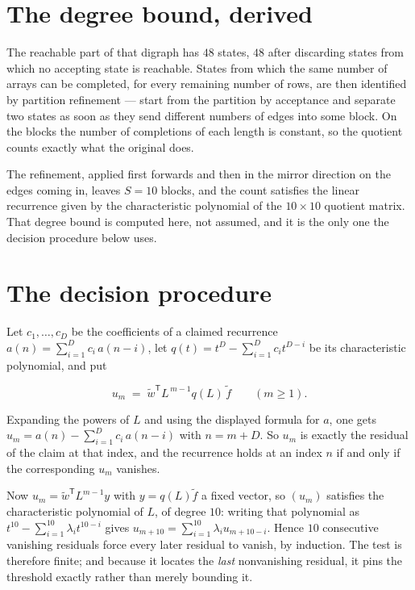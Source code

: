 \documentclass[11pt]{article}
\theoremstyle{definition}
\begin{document}
\section{The degree bound, derived}

The reachable part of that digraph has $48$ states, $48$ after discarding states from which no accepting state is reachable. States from which the same number of arrays can be completed, for every remaining number of rows, are then identified by partition refinement --- start from the partition by acceptance and separate two states as soon as they send different numbers of edges into some block. On the blocks the number of completions of each length is constant, so the quotient counts exactly what the original does.

The refinement, applied first forwards and then in the mirror direction on the edges coming in, leaves $S = 10$ blocks, and the count satisfies the linear recurrence given by the characteristic polynomial of the $10 \times 10$ quotient matrix. That degree bound is computed here, not assumed, and it is the only one the decision procedure below uses.

\section{The decision procedure}

Let $c_1,\dots,c_D$ be the coefficients of a claimed recurrence $a(n) = \sum_{i=1}^{D} c_i\,a(n-i)$, let $q(t) = t^{D} - \sum_{i=1}^{D} c_i t^{D-i}$ be its characteristic polynomial, and put

\[u_m \;=\; \tilde w^{\mathsf T} L^{\,m-1} q(L)\,\tilde f \qquad (m \ge 1).\]

Expanding the powers of $L$ and using the displayed formula for $a$, one gets $u_m = a(n) - \sum_{i=1}^{D} c_i\,a(n-i)$ with $n = m + D$. So $u_m$ is exactly the residual of the claim at that index, and the recurrence holds at an index $n$ if and only if the corresponding $u_m$ vanishes.

Now $u_m = \tilde w^{\mathsf T} L^{m-1} y$ with $y = q(L)\tilde f$ a fixed vector, so $(u_m)$ satisfies the characteristic polynomial of $L$, of degree $10$: writing that polynomial as $t^{10} - \sum_{i=1}^{10} \lambda_i t^{10-i}$ gives $u_{m+10} = \sum_{i=1}^{10} \lambda_i u_{m+10-i}$. Hence $10$ consecutive vanishing residuals force every later residual to vanish, by induction. The test is therefore finite; and because it locates the {\itshape last} nonvanishing residual, it pins the threshold exactly rather than merely bounding it.
\end{document}

